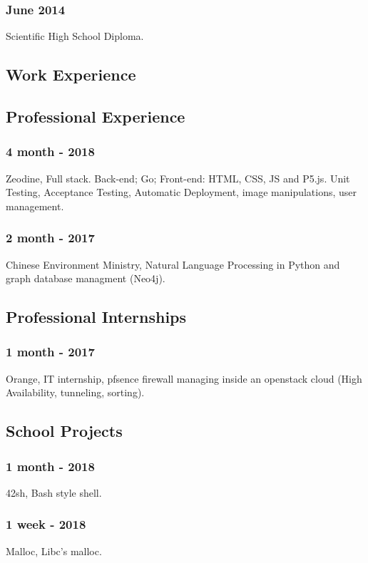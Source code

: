 \documentclass{article}
\begin{document}
        \subsubsection{June 2014}
            Scientific High School Diploma.


    \begin{multicols}{2}
        \section{Work Experience}
            \subsection{Professional Experience}
                \subsubsection{4 month - 2018}
                    Zeodine, Full stack. Back-end; Go; Front-end: HTML, CSS, JS and P5.js.
                    Unit Testing, Acceptance Testing, Automatic Deployment, image manipulations, user management.
                \subsubsection{2 month - 2017}
                    Chinese Environment Ministry, Natural Language Processing in Python and graph database managment (Neo4j).
            \subsection{Professional Internships}
                \subsubsection{1 month - 2017}
                    Orange, IT internship, pfsence firewall managing inside an openstack cloud (High Availability, tunneling, sorting).
            \subsection{School Projects}
                \subsubsection{1 month - 2018}
                    42sh, Bash style shell.
                \subsubsection{1 week - 2018}
                    Malloc, Libc's malloc.

\end{multicols}
\end{document}
